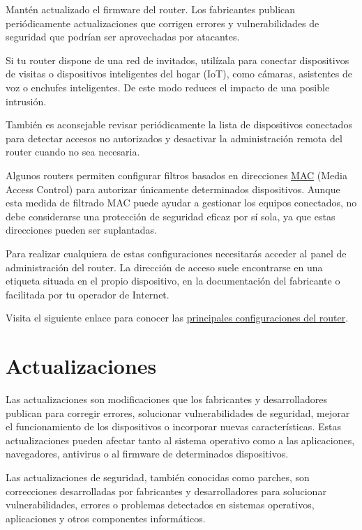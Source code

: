 \documentclass[
  spanish,
  a4paper,
  openany]{book}
\begin{document}
Mantén actualizado el firmware del router. Los fabricantes publican periódicamente actualizaciones que corrigen errores y vulnerabilidades de seguridad que podrían ser aprovechadas por atacantes.

Si tu router dispone de una red de invitados, utilízala para conectar dispositivos de visitas o dispositivos inteligentes del hogar (IoT), como cámaras, asistentes de voz o enchufes inteligentes. De este modo reduces el impacto de una posible intrusión.

También es aconsejable revisar periódicamente la lista de dispositivos conectados para detectar accesos no autorizados y desactivar la administración remota del router cuando no sea necesaria.

Algunos routers permiten configurar filtros basados en direcciones \href{https://es.wikipedia.org/wiki/Filtrado_MAC}{MAC} (Media Access Control) para autorizar únicamente determinados dispositivos. Aunque esta medida de filtrado MAC puede ayudar a gestionar los equipos conectados, no debe considerarse una protección de seguridad eficaz por sí sola, ya que estas direcciones pueden ser suplantadas.

Para realizar cualquiera de estas configuraciones necesitarás acceder al panel de administración del router. La dirección de acceso suele encontrarse en una etiqueta situada en el propio dispositivo, en la documentación del fabricante o facilitada por tu operador de Internet.

Visita el siguiente enlace para conocer las \href{https://www.incibe.es/ciudadania/formacion/infografias/principales-configuraciones-del-router}{principales configuraciones del router}.

\section{Actualizaciones}\label{actualizaciones}

Las actualizaciones son modificaciones que los fabricantes y desarrolladores publican para corregir errores, solucionar vulnerabilidades de seguridad, mejorar el funcionamiento de los dispositivos o incorporar nuevas características. Estas actualizaciones pueden afectar tanto al sistema operativo como a las aplicaciones, navegadores, antivirus o al firmware de determinados dispositivos.

Las actualizaciones de seguridad, también conocidas como parches, son correcciones desarrolladas por fabricantes y desarrolladores para solucionar vulnerabilidades, errores o problemas detectados en sistemas operativos, aplicaciones y otros componentes informáticos.
\end{document}
